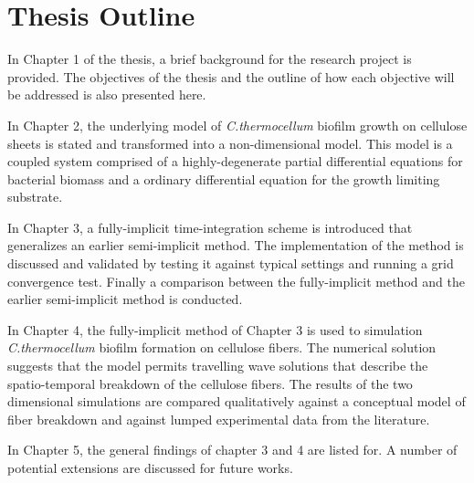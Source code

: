\section{Thesis Outline}

In Chapter 1 of the thesis, a brief background for the research project is provided.
The objectives of the thesis and the outline of how each objective will be addressed is also presented here.

In Chapter 2, the underlying model of \textit{C.thermocellum} biofilm growth on cellulose sheets is stated and transformed into a non-dimensional model.
This model is a coupled system comprised of a highly-degenerate partial differential equations for bacterial biomass and a ordinary differential equation for the growth limiting substrate.

In Chapter 3, a fully-implicit time-integration scheme is introduced that generalizes an earlier semi-implicit method.
The implementation of the method is discussed and validated by testing it against typical settings and running a grid convergence test.
Finally a comparison between the fully-implicit method and the earlier semi-implicit method is conducted.

In Chapter 4, the fully-implicit method of Chapter 3 is used to simulation \textit{C.thermocellum} biofilm formation on cellulose fibers. 
The numerical solution suggests that the model permits travelling wave solutions that describe the spatio-temporal breakdown of the cellulose fibers.
The results of the two dimensional simulations are compared qualitatively against a conceptual model of fiber breakdown and against lumped experimental data from the literature.

In Chapter 5, the general findings of chapter 3 and 4 are listed for.
A number of potential extensions are discussed for future works.
